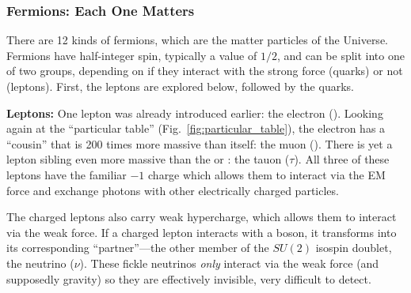 
\subsubsection{Fermions: Each One Matters}
There are 12 kinds of fermions, which are the matter particles of the Universe.
Fermions have half-integer spin, typically a value of $1/2$, and can be split into one of two groups, depending on if they interact with the strong force (quarks) or not (leptons).
First, the leptons are explored below, followed by the quarks.

\textbf{Leptons:}
One lepton was already introduced earlier: the electron (\Pe).
Looking again at the ``particular table'' (Fig.~\ref{fig:particular_table}), the electron has a ``cousin'' that is 200 times more massive than itself: the muon (\Pmu).
There is yet a lepton sibling even more massive than the \Pe or \Pmu: the tauon ($\tau$). 
All three of these leptons have the familiar $-1$ charge which allows them to interact via the EM force and exchange photons with other electrically charged particles.

The charged leptons also carry weak hypercharge, which allows them to interact via the weak force. 
If a charged lepton interacts with a \PWpm boson, it transforms into its corresponding ``partner''---the other member of the $SU(2)$ isospin doublet, the neutrino ($\nu$).
These fickle neutrinos \emph{only} interact via the weak force (and supposedly gravity) so they are effectively invisible, \ie very difficult to detect.


